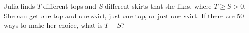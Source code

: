 Julia finds $T$ different tops and $S$ different skirts that she likes, where $T\ge S>0$. She can get one top and one skirt, just one top, or just one skirt. If there are $50$ ways to make her choice, what is $T-S$?

